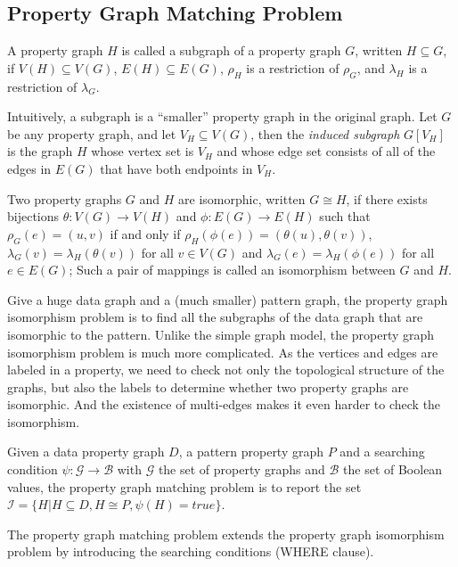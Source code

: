 \subsection{Property Graph Matching Problem}
\begin{definition}[Subgraph]
  A property graph $H$ is called a subgraph of a property graph $G$, written $H \subseteq G$, if
  $V(H) \subseteq V(G)$, $E(H) \subseteq E(G)$, $\rho_H$ is a restriction of $\rho_G$, and $\lambda_H$ is a restriction of $\lambda_G$.
\end{definition}
Intuitively, a subgraph is a ``smaller'' property graph in the original graph.
Let $G$ be any property graph, and let $V_H \subseteq V(G)$, then the \emph{induced subgraph} $G[V_H]$ is the graph $H$ whose vertex set is $V_H$ and whose edge set consists of all of the edges in $E(G)$ that have both endpoints in $V_H$.
\begin{definition}
  Two property graphs $G$ and $H$ are isomorphic, written $G \cong H$,
  if there exists bijections $\theta: V(G) \rightarrow V(H)$ and $\phi: E(G) \rightarrow E(H)$ such that
  $\rho_G(e) = (u, v)$ if and only if $\rho_H(\phi(e)) = (\theta(u), \theta(v))$,
  $\lambda_G(v) = \lambda_H(\theta(v))$ for all $v \in V(G)$
  and $\lambda_G(e) = \lambda_H(\phi(e))$ for all $e \in E(G)$;
  Such a pair of mappings is called an isomorphism between $G$ and $H$.
\end{definition}
Give a huge data graph and a (much smaller) pattern graph,
the property graph isomorphism problem is to find all the subgraphs of the data graph that are isomorphic to the pattern.
Unlike the simple graph model, the property graph isomorphism problem is much more complicated.
As the vertices and edges are labeled in a property, we need to check not only the topological structure of the graphs,
but also the labels to determine whether two property graphs are isomorphic.
And the existence of multi-edges makes it even harder to check the isomorphism.
\begin{definition}\label{def:property_graph_matching}
  Given a data property graph $D$, a pattern property graph $P$ and a searching condition $\psi: \mathcal{G} \rightarrow \mathcal{B}$ with $\mathcal{G}$ the set of property graphs and $\mathcal{B}$ the set of Boolean values,
  the property graph matching problem is to report the set $\mathcal{I} = \{H | H \subseteq D, H \cong P, \psi(H) = true\}$.
\end{definition}
The property graph matching problem extends the property graph isomorphism problem by introducing the searching conditions (WHERE clause).
